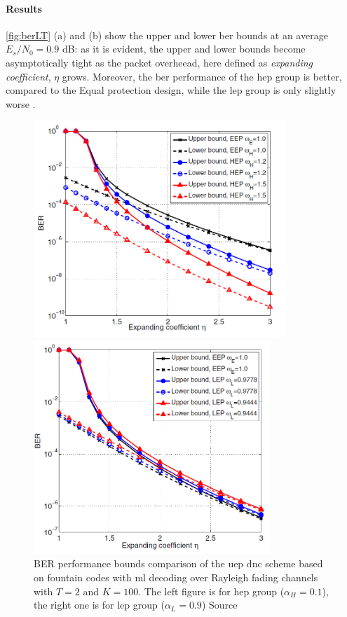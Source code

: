 \paragraph{Results}
\autoref{fig:berLT} (a) and (b) show the upper and lower \gls{ber} bounds at an average $E_s/N_0 = 0.9$ dB: as it is evident, the upper and lower bounds become asymptotically tight as the packet overheead, here defined as \textit{expanding coefficient}, $\eta$ grows. Moreover, the \gls{ber} performance of the \gls{hep} group is better, compared to the Equal protection design, while the \gls{lep} group is only slightly worse \cite{Yue2014}.
\begin{figure}
\centering
\begin{minipage}[c]{0.47\textwidth}
  \includegraphics[width = 0.85\textwidth]{img/bounds_14a}
\end{minipage}
\begin{minipage}[c]{0.47\textwidth}
  \includegraphics[width = 0.8\textwidth]{img/bounds_14b}
\end{minipage}
\caption{\footnotesize{BER performance bounds comparison of the \gls{uep} \gls{dnc} scheme based on fountain codes with \gls{ml} decoding over Rayleigh fading channels with $T=2$ and $K=100$. The left figure is for \gls{hep} group ($\alpha_H = 0.1$), the right one is for \gls{lep} group ($\alpha_L = 0.9$) Source \cite{Yue2014}}}
\label{fig:berLT}
\end{figure}
